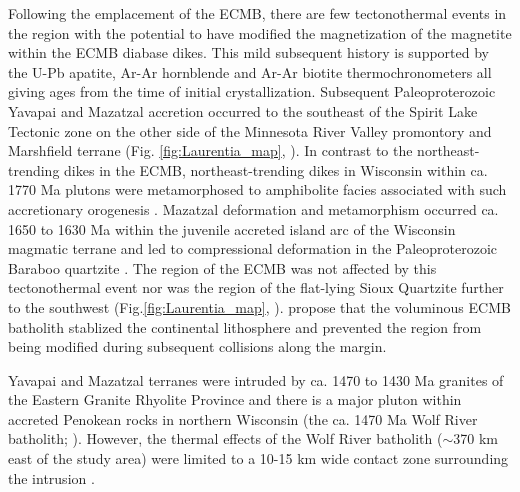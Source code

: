 \documentclass[draft]{agujournal2019}
\begin{document}
Following the emplacement of the ECMB, there are few tectonothermal events in the region with the potential to have modified the magnetization of the magnetite within the ECMB diabase dikes. This mild subsequent history is supported by the U-Pb apatite, Ar-Ar hornblende and Ar-Ar biotite thermochronometers all giving ages from the time of initial crystallization. Subsequent Paleoproterozoic Yavapai and Mazatzal accretion occurred to the southeast of the Spirit Lake Tectonic zone on the other side of the Minnesota River Valley promontory and Marshfield terrane (Fig. \ref{fig:Laurentia_map}, ). In contrast to the northeast-trending dikes in the ECMB, northeast-trending dikes in Wisconsin within ca. 1770 Ma plutons were metamorphosed to amphibolite facies associated with such accretionary orogenesis \cite{Holm1998b}. Mazatzal deformation and metamorphism occurred ca. 1650 to 1630 Ma within the juvenile accreted island arc of the Wisconsin magmatic terrane and led to compressional deformation in the Paleoproterozoic Baraboo quartzite \cite{Holm1998c}. The region of the ECMB was not affected by this tectonothermal event nor was the region of the flat-lying Sioux Quartzite further to the southwest (Fig.\ref{fig:Laurentia_map}, ).  propose that the voluminous ECMB batholith stablized the continental lithosphere and prevented the region from being modified during subsequent collisions along the margin.

Yavapai and Mazatzal terranes were intruded by ca. 1470 to 1430 Ma granites of the Eastern Granite Rhyolite Province and there is a major pluton within accreted Penokean rocks in northern Wisconsin (the ca. 1470 Ma Wolf River batholith; \cite{Dewane2007a}). However, the thermal effects of the Wolf River batholith ($\sim$370 km east of the study area) were limited to a 10-15 km wide contact zone surrounding the intrusion \cite{Holm2019a}. 

\end{document}
